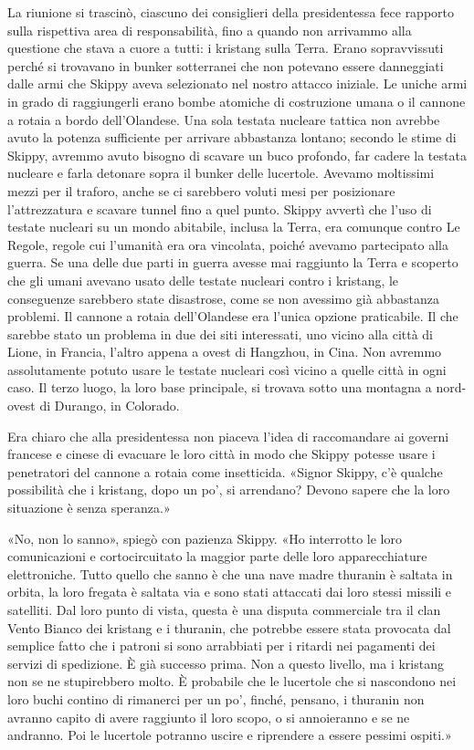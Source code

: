 La riunione si trascinò, ciascuno dei consiglieri della presidentessa
fece rapporto sulla rispettiva area di responsabilità, fino a quando non
arrivammo alla questione che stava a cuore a tutti: i kristang sulla
Terra. Erano sopravvissuti perché si trovavano in bunker sotterranei che
non potevano essere danneggiati dalle armi che Skippy aveva selezionato
nel nostro attacco iniziale. Le uniche armi in grado di raggiungerli
erano bombe atomiche di costruzione umana o il cannone a rotaia a bordo
dell'Olandese. Una sola testata nucleare tattica non avrebbe avuto la
potenza sufficiente per arrivare abbastanza lontano; secondo le stime di
Skippy, avremmo avuto bisogno di scavare un buco profondo, far cadere la
testata nucleare e farla detonare sopra il bunker delle lucertole.
Avevamo moltissimi mezzi per il traforo, anche se ci sarebbero voluti
mesi per posizionare l'attrezzatura e scavare tunnel fino a quel punto.
Skippy avvertì che l'uso di testate nucleari su un mondo abitabile,
inclusa la Terra, era comunque contro Le Regole, regole cui l'umanità
era ora vincolata, poiché avevamo partecipato alla guerra. Se una delle
due parti in guerra avesse mai raggiunto la Terra e scoperto che gli
umani avevano usato delle testate nucleari contro i kristang, le
conseguenze sarebbero state disastrose, come se non avessimo già
abbastanza problemi. Il cannone a rotaia dell'Olandese era l'unica
opzione praticabile. Il che sarebbe stato un problema in due dei siti
interessati, uno vicino alla città di Lione, in Francia, l'altro appena
a ovest di Hangzhou, in Cina. Non avremmo assolutamente potuto usare le
testate nucleari così vicino a quelle città in ogni caso. Il terzo
luogo, la loro base principale, si trovava sotto una montagna a
nord-ovest di Durango, in Colorado.

Era chiaro che alla presidentessa non piaceva l'idea di raccomandare ai
governi francese e cinese di evacuare le loro città in modo che Skippy
potesse usare i penetratori del cannone a rotaia come insetticida.
«Signor Skippy, c'è qualche possibilità che i kristang, dopo un po', si
arrendano? Devono sapere che la loro situazione è senza speranza.»

«No, non lo sanno», spiegò con pazienza Skippy. «Ho interrotto le loro
comunicazioni e cortocircuitato la maggior parte delle loro
apparecchiature elettroniche. Tutto quello che sanno è che una nave
madre thuranin è saltata in orbita, la loro fregata è saltata via e sono
stati attaccati dai loro stessi missili e satelliti. Dal loro punto di
vista, questa è una disputa commerciale tra il clan Vento Bianco dei
kristang e i thuranin, che potrebbe essere stata provocata dal semplice
fatto che i patroni si sono arrabbiati per i ritardi nei pagamenti dei
servizi di spedizione. È già successo prima. Non a questo livello, ma i
kristang non se ne stupirebbero molto. È probabile che le lucertole che
si nascondono nei loro buchi contino di rimanerci per un po', finché,
pensano, i thuranin non avranno capito di avere raggiunto il loro scopo,
o si annoieranno e se ne andranno. Poi le lucertole potranno uscire e
riprendere a essere pessimi ospiti.»

